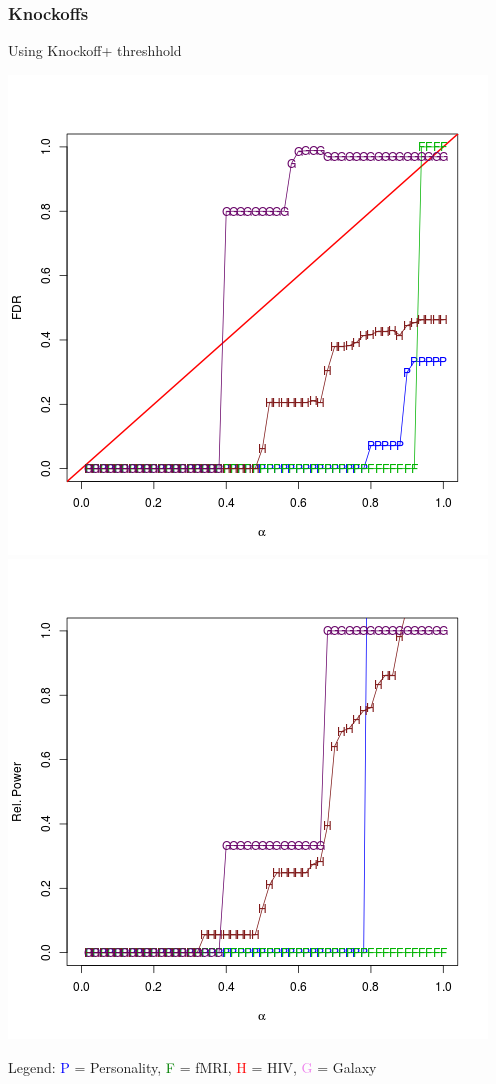 \documentclass{beamer}
\begin{document}
\begin{frame}
\frametitle{Knockoffs}
Using Knockoff+ threshhold

\begin{center}
\includegraphics[scale = 0.3]{res_kp_type1.png}
\includegraphics[scale = 0.3]{res_kp_power.png}
\end{center}

Legend: \textcolor{blue}{P} = Personality, \textcolor{green}{F} = fMRI,
\textcolor{red}{H} = HIV, \textcolor{violet}{G} = Galaxy
\end{frame}
\end{document}
